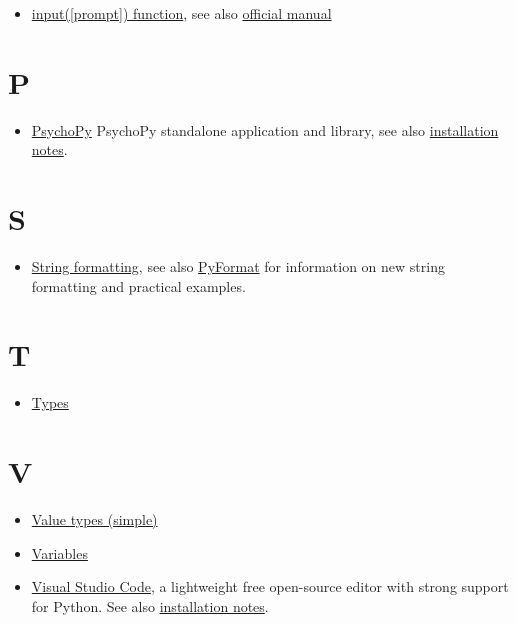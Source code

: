 \documentclass[
]{book}
\providecommand{\tightlist}{%
  \setlength{\itemsep}{0pt}\setlength{\parskip}{0pt}}
\begin{document}
\begin{itemize}
\tightlist
\item
  \protect\hyperlink{input-function}{input({[}prompt{]}) function}, see also \href{https://docs.python.org/3/library/functions.html\#input}{official manual}
\end{itemize}

\hypertarget{p}{%
\section*{P}\label{p}}

\begin{itemize}
\tightlist
\item
  \href{https://www.psychopy.org/}{PsychoPy} PsychoPy standalone application and library, see also \protect\hyperlink{install-psychopy}{installation notes}.
\end{itemize}

\hypertarget{s}{%
\section*{S}\label{s}}

\begin{itemize}
\tightlist
\item
  \protect\hyperlink{string-formatting}{String formatting}, see also \href{https://pyformat.info/}{PyFormat} for information on new string formatting and practical examples.
\end{itemize}

\hypertarget{t}{%
\section*{T}\label{t}}

\begin{itemize}
\tightlist
\item
  \protect\hyperlink{value-types}{Types}
\end{itemize}

\hypertarget{v}{%
\section*{V}\label{v}}

\begin{itemize}
\item
  \protect\hyperlink{value-types}{Value types (simple)}
\item
  \protect\hyperlink{variables}{Variables}
\item
  \href{https://code.visualstudio.com/}{Visual Studio Code}, a lightweight free open-source editor with strong support for Python. See also \protect\hyperlink{install-vs-code}{installation notes}.
\end{itemize}
\end{document}
